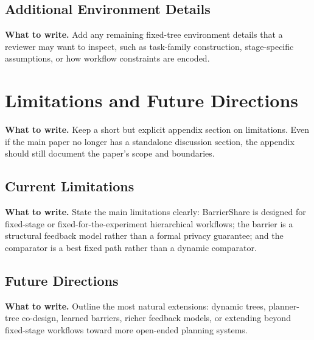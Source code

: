 \documentclass{article}
\newcommand{\towrite}[1]{\noindent\textbf{What to write.} #1}
\begin{document}
\subsection{Additional Environment Details}

\towrite{Add any remaining fixed-tree environment details that a reviewer may want to inspect, such as task-family construction, stage-specific assumptions, or how workflow constraints are encoded.}

\section{Limitations and Future Directions}

\towrite{Keep a short but explicit appendix section on limitations. Even if the main paper no longer has a standalone discussion section, the appendix should still document the paper's scope and boundaries.}

\subsection{Current Limitations}

\towrite{State the main limitations clearly: BarrierShare is designed for fixed-stage or fixed-for-the-experiment hierarchical workflows; the barrier is a structural feedback model rather than a formal privacy guarantee; and the comparator is a best fixed path rather than a dynamic comparator.}

\subsection{Future Directions}

\towrite{Outline the most natural extensions: dynamic trees, planner-tree co-design, learned barriers, richer feedback models, or extending beyond fixed-stage workflows toward more open-ended planning systems.}
\end{document}
